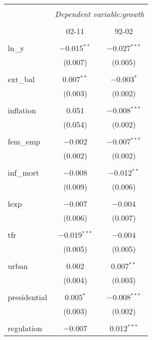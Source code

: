 \documentclass{article}
\begin{document}
	
\begin{table}[!htbp] \centering 
  \caption{} 
  \label{} 
\begin{tabular}{@{\extracolsep{5pt}}lcc} 
\\[-1.8ex]\hline 
\hline \\[-1.8ex] 
 & \multicolumn{2}{c}{\textit{Dependent variable:growth}} \\ 
\cline{2-3} 
 
\\[-1.8ex] & 02-11 & 92-02\\ 
\hline \\[-1.8ex] 
 ln\_y & $-$0.015$^{**}$ & $-$0.027$^{***}$ \\ 
  & (0.007) & (0.005) \\ 
  & & \\ 
 ext\_bal & 0.007$^{**}$ & $-$0.003$^{*}$ \\ 
  & (0.003) & (0.002) \\ 
  & & \\ 
 inflation & 0.051 & $-$0.008$^{***}$ \\ 
  & (0.054) & (0.002) \\ 
  & & \\ 
 fem\_emp & $-$0.002 & $-$0.007$^{***}$ \\ 
  & (0.002) & (0.002) \\ 
  & & \\ 
 inf\_mort & $-$0.008 & $-$0.012$^{**}$ \\ 
  & (0.009) & (0.006) \\ 
  & & \\ 
 lexp & $-$0.007 & $-$0.004 \\ 
  & (0.006) & (0.007) \\ 
  & & \\ 
 tfr & $-$0.019$^{***}$ & $-$0.004 \\ 
  & (0.005) & (0.005) \\ 
  & & \\ 
 urban & 0.002 & 0.007$^{**}$ \\ 
  & (0.004) & (0.003) \\ 
  & & \\ 
 presidential & 0.005$^{*}$ & $-$0.008$^{***}$ \\ 
  & (0.003) & (0.002) \\ 
  & & \\ 
 regulation & $-$0.007 & 0.012$^{***}$ \\ 

\end{tabular}
\end{table}
\end{document}
